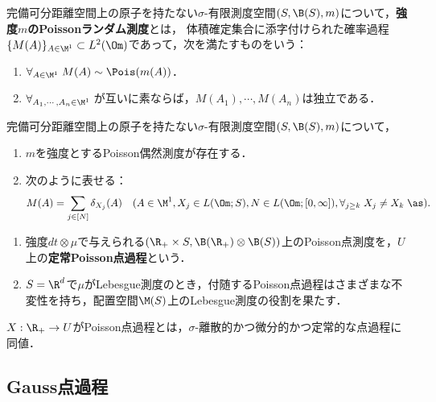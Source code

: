 \documentclass[uplatex,dvipdfmx]{jsreport}
\begin{document}
\begin{definition}[Poisson偶然測度]
    完備可分距離空間上の原子を持たない$\sigma$-有限測度空間$(S,\B(S),m)$について，\textbf{強度$m$のPoissonランダム測度}とは，
    体積確定集合に添字付けられた確率過程$\{M(A)\}_{A\in\M^1}\subset L^2(\Om)$であって，次を満たすものをいう：
    \begin{enumerate}
        \item $\forall_{A\in\M^1}\;M(A)\sim\Pois(m(A))$．
        \item $\forall_{A_1,\cdots,A_n\in\M^1}\;$が互いに素ならば，$M(A_1),\cdots,M(A_n)$は独立である．
    \end{enumerate}
\end{definition}

\begin{theorem}[Poisson測度の構成と表示]
    完備可分距離空間上の原子を持たない$\sigma$-有限測度空間$(S,\B(S),m)$について，
    \begin{enumerate}
        \item $m$を強度とするPoisson偶然測度が存在する．
        \item 次のように表せる：
        \[M(A)=\sum_{j\in[N]}\delta_{X_j}(A)\quad(A\in\M^1,X_j\in L(\Om;S),N\in L(\Om;[0,\infty]),\forall_{j\ge k}\;X_j\ne X_k\;\as).\]
    \end{enumerate}
\end{theorem}

\begin{example}\mbox{}
    \begin{enumerate}
        \item 強度$dt\otimes \mu$で与えられる$(\R_+\times S,\B(\R_+)\otimes\B(S))$上のPoisson点測度を，$U$上の\textbf{定常Poisson点過程}という．
        \item $S=\R^d$で$\mu$がLebesgue測度のとき，付随するPoisson点過程はさまざまな不変性を持ち，配置空間$\M(S)$上のLebesgue測度の役割を果たす．
    \end{enumerate}
\end{example}


\begin{lemma}
    $X:\R_+\to U$がPoisson点過程とは，$\sigma$-離散的かつ微分的かつ定常的な点過程に同値．
\end{lemma}

\subsection{Gauss点過程}
\end{document}
